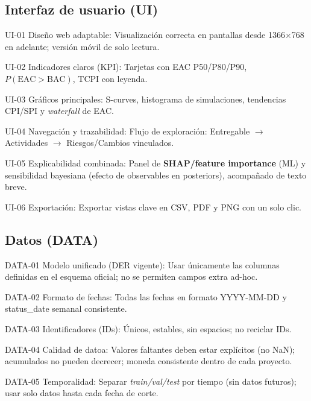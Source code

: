 \documentclass[12pt]
{charter}
\begin{document}
\subsection{Interfaz de usuario (UI)}
\begin{description}
  \item UI-01 Diseño web adaptable: Visualización correcta en pantallas desde 1366$\times$768 en adelante; versión móvil de solo lectura.

  \item UI-02 Indicadores claros (KPI): Tarjetas con EAC P50/P80/P90, $P(\text{EAC}>\text{BAC})$, TCPI con leyenda.

  \item UI-03 Gráficos principales: S-curves, histograma de simulaciones, tendencias CPI/SPI y \textit{waterfall} de EAC.

  \item UI-04 Navegación y trazabilidad: Flujo de exploración: Entregable $\rightarrow$ Actividades $\rightarrow$ Riesgos/Cambios vinculados.

  \item UI-05 Explicabilidad combinada: Panel de \textbf{SHAP/feature importance} (ML) y sensibilidad bayesiana (efecto de observables en posteriors), acompañado de texto breve.

   \item UI-06 Exportación: Exportar vistas clave en CSV, PDF y PNG con un solo clic.

\end{description}

\subsection{Datos (DATA)}
\begin{description}
  \item DATA-01 Modelo unificado (DER vigente): Usar únicamente las columnas definidas en el esquema oficial; no se permiten campos extra ad-hoc.

  \item DATA-02 Formato de fechas: Todas las fechas en formato YYYY-MM-DD y status\_date semanal consistente.

  \item DATA-03 Identificadores (IDs): Únicos, estables, sin espacios; no reciclar IDs.

  \item DATA-04 Calidad de datoa: Valores faltantes deben estar explícitos (no NaN); acumulados no pueden decrecer; moneda consistente dentro de cada proyecto.

  \item DATA-05 Temporalidad: Separar \textit{train/val/test} por tiempo (sin datos futuros); usar solo datos hasta cada fecha de corte.

\end{description}
\end{document}
